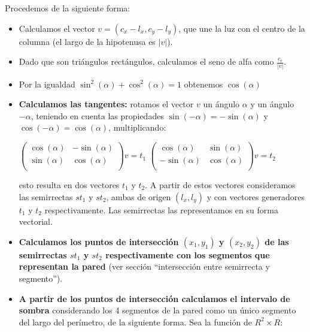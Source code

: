 Procedemos de la siguiente forma:

\begin{itemize}
\item Calculamos el vector $v = (c_x-l_x, c_y-l_y)$, que une la luz con el centro de la columna
      (el largo de la hipotenusa es $|v|$).

\item Dado que son triángulos rectángulos, calculamos el seno de alfa como
$\displaystyle\frac{c_r}{|v|}$.

\item Por la igualdad $\sin^2(\alpha) + \cos^2(\alpha) = 1$ obtenemos $\cos(\alpha)$

\item \textbf{Calculamos las tangentes:} rotamos el vector $v$ un ángulo $\alpha$ y un ángulo
$-\alpha$, teniendo en cuenta las propiedades $\sin(-\alpha) = -\sin(\alpha)$ y
$\cos(-\alpha) = \cos(\alpha)$, multiplicando:

\vspace{0.2cm}
\begin{center}
$\left(
\begin{array}{cc}
\cos(\alpha) & -\sin(\alpha) \\
\sin(\alpha) & \cos(\alpha) \\
\end{array}
\right)
v = t_1$
\hspace{1cm}
$\left(
\begin{array}{cc}
\cos(\alpha) & \sin(\alpha) \\
-\sin(\alpha) & \cos(\alpha) \\
\end{array}
\right)  
v = t_2$
\end{center}
\vspace{0.2cm}

esto resulta en dos vectores $t_1$ y $t_2$. A partir de estos vectores consideramos las semirrectas
$st_1$ y $st_2$, ambas de origen $(l_x, l_y)$ y con vectores generadores $t_1$ y $t_2$
respectivamente. Las semirrectas las representamos en su forma vectorial.

\item \textbf{Calculamos los puntos de intersección $(x_1, y_1)$ y $(x_2, y_2)$ de las semirrectas
$st_1$ y $st_2$ respectivamente con los segmentos que representan la pared} (ver sección
``intersección entre semirrecta y segmento'').

\item \textbf{A partir de los puntos de intersección calculamos el intervalo de sombra}
considerando los 4 segmentos de la pared como un único segmento del largo del perímetro,
de la siguiente forma. Sea la función de $R^2 \times R$:


\end{itemize}
